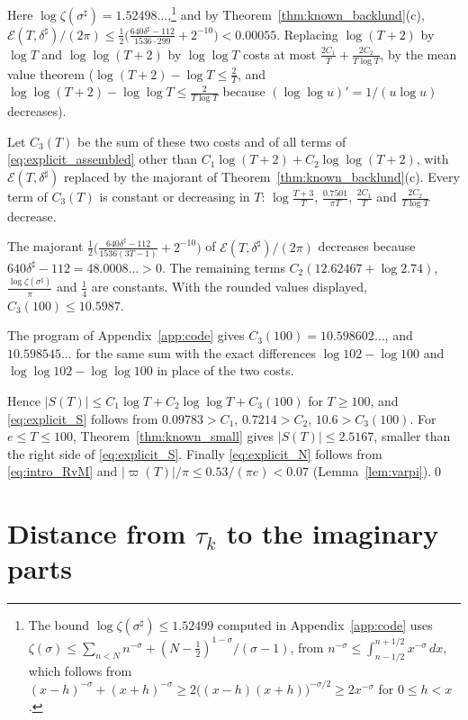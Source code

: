 \documentclass[11pt,a4paper]{article}
\makeatletter
\numberwithin{equation}{section}
\DeclareRobustCommand{\CGref}[1]{\ref{#1}}
\DeclareRobustCommand{\CGeqref}[1]{\eqref{#1}}
\let\CG@origref\ref
\let\CG@origeqref\eqref
\newcommand{\CG@gettip}[1]{\@ifundefined{CGTip@#1}{#1}{\csname CGTip@#1\endcsname}}
\DeclareRobustCommand{\CGref}[1]{\pdftooltip{\CG@origref{#1}}{\CG@gettip{#1}}}
\DeclareRobustCommand{\CGeqref}[1]{\pdftooltip{\CG@origeqref{#1}}{\CG@gettip{#1}}}
\theoremstyle{definition}
\theoremstyle{remark}
\makeatother
\begin{document}
Here $\log\zeta(\sigma^\sharp)=1.52498\ldots$,\footnote{The bound $\log\zeta(\sigma^\sharp)\le1.52499$ computed in Appendix~\CGref{app:code} uses $\zeta(\sigma)\le\sum_{n<N}n^{-\sigma}+(N-\frac12)^{1-\sigma}/(\sigma-1)$, from $n^{-\sigma}\le\int_{n-1/2}^{n+1/2}x^{-\sigma}\,dx$, which follows from $(x-h)^{-\sigma}+(x+h)^{-\sigma}\ge2\bigl((x-h)(x+h)\bigr)^{-\sigma/2}\ge2x^{-\sigma}$ for $0\le h<x$.} and by Theorem~\CGref{thm:known_backlund}(c), $\mathcal E(T,\delta^\sharp)/(2\pi)\le\frac12\bigl(\frac{640\delta^\sharp-112}{1536\cdot299}+2^{-10}\bigr)<0.00055$. Replacing $\log(T+2)$ by $\log T$ and $\log\log(T+2)$ by $\log\log T$ costs at most $\frac{2C_1}T+\frac{2C_2}{T\log T}$, by the mean value theorem ($\log(T+2)-\log T\le\frac2T$, and $\log\log(T+2)-\log\log T\le\frac2{T\log T}$ because $(\log\log u)'=1/(u\log u)$ decreases).

Let $C_3(T)$ be the sum of these two costs and of all terms of \CGeqref{eq:explicit_assembled} other than $C_1\log(T+2)+C_2\log\log(T+2)$, with $\mathcal E(T,\delta^\sharp)$ replaced by the majorant of Theorem~\CGref{thm:known_backlund}(c). Every term of $C_3(T)$ is constant or decreasing in $T$: $\log\frac{T+3}T$, $\frac{0.7501}{\pi T}$, $\frac{2C_1}T$ and $\frac{2C_2}{T\log T}$ decrease.

The majorant $\frac12\bigl(\frac{640\delta^\sharp-112}{1536(3T-1)}+2^{-10}\bigr)$ of $\mathcal E(T,\delta^\sharp)/(2\pi)$ decreases because $640\delta^\sharp-112=48.0008\ldots>0$. The remaining terms $C_2(12.62467+\log2.74)$, $\frac{\log\zeta(\sigma^\sharp)}\pi$ and $\frac14$ are constants. With the rounded values displayed, $C_3(100)\le10.5987$.

The program of Appendix~\CGref{app:code} gives $C_3(100)=10.598602\ldots$, and $10.598545\ldots$ for the same sum with the exact differences $\log102-\log100$ and $\log\log102-\log\log100$ in place of the two costs.

Hence $|S(T)|\le C_1\log T+C_2\log\log T+C_3(100)$ for $T\ge100$, and \CGeqref{eq:explicit_S} follows from $0.09783>C_1$, $0.7214>C_2$, $10.6>C_3(100)$. For $e\le T\le100$, Theorem~\CGref{thm:known_small} gives $|S(T)|\le2.5167$, smaller than the right side of \CGeqref{eq:explicit_S}. Finally \CGeqref{eq:explicit_N} follows from \CGeqref{eq:intro_RvM} and $|\varpi(T)|/\pi\le0.53/(\pi e)<0.07$ (Lemma~\CGref{lem:varpi}).\qed

\section{Distance from \texorpdfstring{$\tau_k$}{tau_k} to the imaginary parts}\label{sec:distance}
\end{document}
